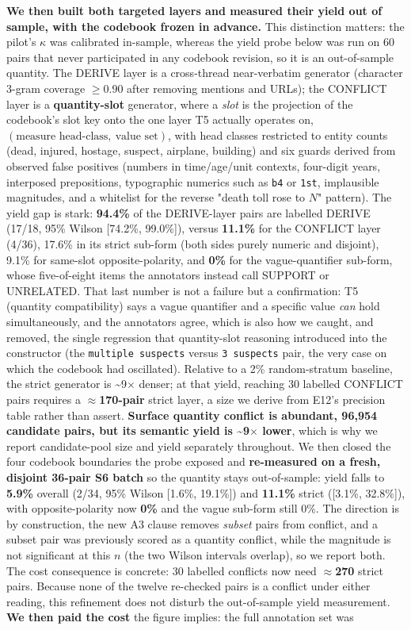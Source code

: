 \textbf{We then built both targeted layers and measured their yield out of sample, with the codebook frozen in advance.} This distinction matters: the pilot's $\kappa$ was calibrated in-sample, whereas the yield probe below was run on 60 pairs that never participated in any codebook revision, so it is an out-of-sample quantity. The DERIVE layer is a cross-thread near-verbatim generator (character 3-gram coverage $\ge0.90$ after removing mentions and URLs); the CONFLICT layer is a \textbf{quantity-slot} generator, where a \emph{slot} is the projection of the codebook's slot key onto the one layer T5 actually operates on, $(\text{measure head-class},\ \text{value set})$, with head classes restricted to entity counts (dead, injured, hostage, suspect, airplane, building) and six guards derived from observed false positives (numbers in time/age/unit contexts, four-digit years, interposed prepositions, typographic numerics such as \texttt{b4} or \texttt{1st}, implausible magnitudes, and a whitelist for the reverse "death toll rose to $N$" pattern). The yield gap is stark: \textbf{94.4\%} of the DERIVE-layer pairs are labelled DERIVE (17/18, 95\% Wilson [74.2\%, 99.0\%]), versus \textbf{11.1\%} for the CONFLICT layer (4/36), 17.6\% in its strict sub-form (both sides purely numeric and disjoint), 9.1\% for same-slot opposite-polarity, and \textbf{0\%} for the vague-quantifier sub-form, whose five-of-eight items the annotators instead call SUPPORT or UNRELATED. That last number is not a failure but a confirmation: T5 (quantity compatibility) says a vague quantifier and a specific value \emph{can} hold simultaneously, and the annotators agree, which is also how we caught, and removed, the single regression that quantity-slot reasoning introduced into the constructor (the \texttt{multiple suspects} versus \texttt{3 suspects} pair, the very case on which the codebook had oscillated). Relative to a 2\% random-stratum baseline, the strict generator is \textasciitilde{}9$\times$ denser; at that yield, reaching 30 labelled CONFLICT pairs requires a \textbf{$\approx$170-pair} strict layer, a size we derive from E12's precision table rather than assert. \textbf{Surface quantity conflict is abundant, 96,954 candidate pairs, but its semantic yield is \textasciitilde{}9$\times$ lower}, which is why we report candidate-pool size and yield separately throughout. We then closed the four codebook boundaries the probe exposed and \textbf{re-measured on a fresh, disjoint 36-pair S6 batch} so the quantity stays out-of-sample: yield falls to \textbf{5.9\%} overall (2/34, 95\% Wilson [1.6\%, 19.1\%]) and \textbf{11.1\%} strict ([3.1\%, 32.8\%]), with opposite-polarity now \textbf{0\%} and the vague sub-form still 0\%. The direction is by construction, the new A3 clause removes \emph{subset} pairs from conflict, and a subset pair was previously scored as a quantity conflict, while the magnitude is not significant at this $n$ (the two Wilson intervals overlap), so we report both. The cost consequence is concrete: 30 labelled conflicts now need \textbf{$\approx$270} strict pairs. Because none of the twelve re-checked pairs is a conflict under either reading, this refinement does not disturb the out-of-sample yield measurement. \textbf{We then paid the cost} the figure implies: the full annotation set was 